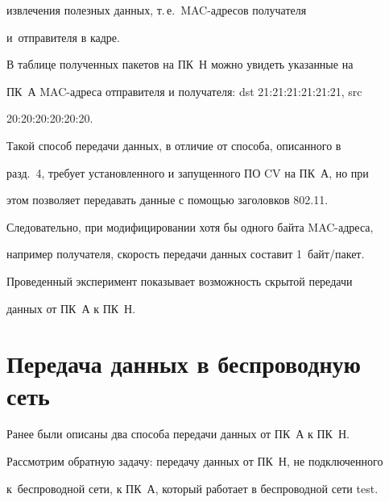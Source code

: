 извлечения полезных данных, т.\,е.\ MAC-ад\-ре\-сов получателя


и~отправителя в кадре.





  В таблице полученных пакетов на ПК~Н можно увидеть указанные на


ПК~А MAC-ад\-ре\-са отправителя и получателя: dst 21:21:21:21:21:21, src


20:20:20:20:20:20.





  Такой способ передачи данных, в отличие от способа, описанного в


разд.~4, требует установленного и запущенного ПО CV на ПК~А, но при


этом позволяет передавать данные с помощью заголовков 802.11.


Следовательно, при модифицировании хотя бы одного байта MAC-ад\-ре\-са,


например получателя, скорость передачи данных составит 1~байт/пакет.





  Проведенный эксперимент показывает возможность скрытой передачи


данных от ПК~А к ПК~Н.





\vspace*{-4pt}





\section{Передача данных в беспроводную сеть}





\vspace*{-2pt}





  Ранее были описаны два способа передачи данных от ПК~А к ПК~Н.


Рассмотрим обратную задачу: передачу данных от ПК~Н, не подключенного


к~беспроводной сети, к ПК~А, который работает в беспроводной сети test.





